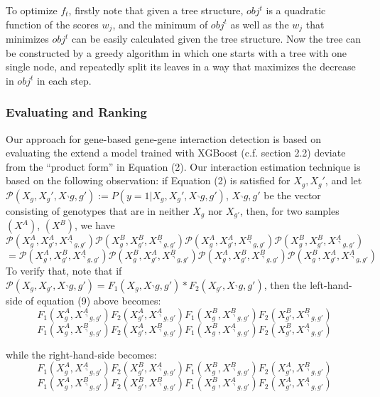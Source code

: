 \documentclass[11pt]{article}
\theoremstyle{plain}
\theoremstyle{definition}
\theoremstyle{remark}
\begin{document}
\noindent To optimize $f_t$, firstly note that given a tree structure, $obj^t$ is a quadratic function of the scores $w_j$,
and the minimum of $obj^t$ as well as the $w_j$ that minimizes $obj^t$ can be easily calculated given the tree structure. Now the tree can be constructed by a greedy algorithm in which one starts with a tree with
one single node, and repeatedly split its leaves in a way that maximizes the decrease in $obj^t$ in each step.
\subsubsection{Evaluating and Ranking}

Our approach for gene-based gene-gene interaction detection is based on evaluating the extend a model trained with XGBoost (c.f. section 2.2) deviate from the ``product form'' in Equation (2). Our interaction estimation
technique is based on the following observation: if Equation (2) is satisfied for $X_g, X_g'$, and let $\mathcal{P}(X_g,X_g',X_\urcorner g,g'):=P(y=1|X_g,X_g',X_\urcorner g,g')$, $X_\urcorner g,g'$ be the vector consisting of genotypes that are in neither $X_g$ nor $X_{g'}$, then, for two samples $(X^A)$, $(X^B)$, we have
\begin{equation*}
\mathcal{P}(X^A_g,X^A_{g'},X^A_{\urcorner g,g'})\mathcal{P}(X^B_g,X^B_{g'},X^B_{\urcorner g,g'})\mathcal{P}(X^A_g,X^A_{g'},X^B_{\urcorner g,g'})\mathcal{P}(X^B_g,X^B_{g'},X^A_{\urcorner g,g'})
\end{equation*}
\begin{equation}=\mathcal{P}(X^A_g,X^B_{g'},X^A_{\urcorner g,g'})\mathcal{P}(X^B_g,X^A_{g'},X^B_{\urcorner g,g'})\mathcal{P}(X^A_g,X^B_{g'},X^B_{\urcorner g,g'})\mathcal{P}(X^B_g,X^A_{g'},X^A_{\urcorner g,g'})
\end{equation}
To verify that, note that if $\mathcal{P}(X_g,X_{g'},X_\urcorner g,g')=F_1(X_g, X_\urcorner g,g')*F_2(X_{g'},X_\urcorner g,g')$, then the left-hand-side of equation (9) above becomes:
\begin{equation*}
F_1(X^A_g,X^A_{\urcorner g,g'})F_2(X^A_{g'},X^A_{\urcorner g,g'})F_1(X^B_g,X^B_{\urcorner g,g'})F_2(X^B_{g'},X^B_{\urcorner g,g'})
\end{equation*}
\begin{equation*}
F_1(X^A_g,X^B_{\urcorner g,g'})F_2(X^A_{g'},X^B_{\urcorner g,g'})F_1(X^B_g,X^A_{\urcorner g,g'})F_2(X^B_{g'},X^A_{\urcorner g,g'})
\end{equation*}

\noindent while the right-hand-side becomes:
\begin{equation*}
F_1(X^A_g,X^A_{\urcorner g,g'})F_2(X^B_{g'},X^A_{\urcorner g,g'})F_1(X^B_g,X^B_{\urcorner g,g'})F_2(X^A_{g'},X^B_{\urcorner g,g'})
\end{equation*}
\begin{equation*}
F_1(X^A_g,X^B_{\urcorner g,g'})F_2(X^B_{g'},X^B_{\urcorner g,g'})F_1(X^B_g,X^A_{\urcorner g,g'})F_2(X^A_{g'},X^A_{\urcorner g,g'})
\end{equation*}
\end{document}
